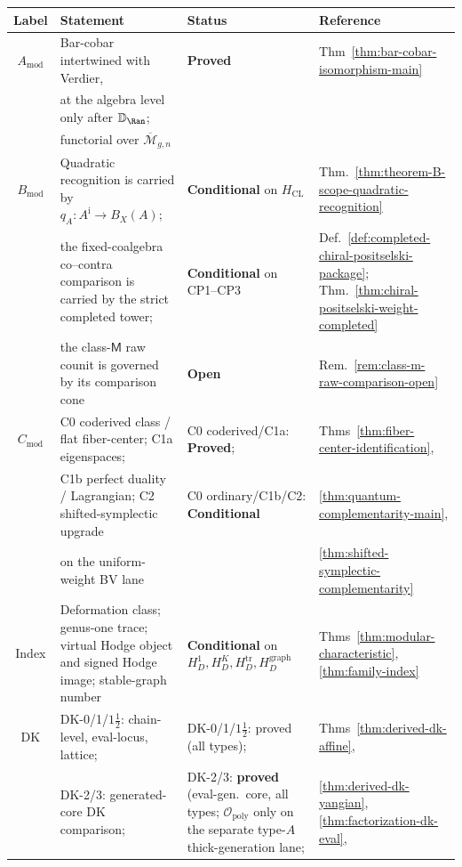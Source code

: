 \begin{center}
\renewcommand{\arraystretch}{1.3}
\begin{tabular}{@{}cp{4.4cm}p{3.8cm}p{4.6cm}@{}}
\toprule
\textbf{Label} & \textbf{Statement} & \textbf{Status} & \textbf{Reference} \\
\midrule
$A_{\mathrm{mod}}$ & Bar-cobar intertwined with Verdier, & \textbf{Proved} & Thm~\ref{thm:bar-cobar-isomorphism-main} \\
 & at the algebra level only after $\mathbb{D}_{\Ran}$; & & \\
 & functorial over $\overline{\mathcal{M}}_{g,n}$ & & \\[2pt]
$B_{\mathrm{mod}}$ & Quadratic recognition is carried by
$q_A\colon A^{\mathrm i}\to B_X(A)$; & \textbf{Conditional} on
$H_{\mathrm{CL}}$ & Thm.~\ref{thm:theorem-B-scope-quadratic-recognition} \\
 & the fixed-coalgebra co--contra comparison is carried by the
strict completed tower; & \textbf{Conditional} on CP1--CP3 &
Def.~\ref{def:completed-chiral-positselski-package};
Thm.~\ref{thm:chiral-positselski-weight-completed} \\
 & the class-$\mathsf M$ raw counit is governed by its comparison
cone & \textbf{Open} &
Rem.~\ref{rem:class-m-raw-comparison-open} \\[2pt]
$C_{\mathrm{mod}}$ & C0 coderived class / flat fiber-center; C1a eigenspaces; & C0 coderived/C1a: \textbf{Proved}; & Thms~\ref{thm:fiber-center-identification}, \\
 & C1b perfect duality / Lagrangian; C2 shifted-symplectic upgrade & C0 ordinary/C1b/C2: \textbf{Conditional} & \ref{thm:quantum-complementarity-main}, \\
 & on the uniform-weight BV lane & & \ref{thm:shifted-symplectic-complementarity} \\[2pt]
Index & Deformation class; genus-one trace; virtual Hodge object and
signed Hodge image; stable-graph number & \textbf{Conditional} on
$H_D^1,H_D^K,H_D^{\mathrm{tr}},H_D^{\mathrm{graph}}$ &
Thms~\ref{thm:modular-characteristic},
\ref{thm:family-index} \\[2pt]
DK & DK-0/1/$1\frac{1}{2}$: chain-level, eval-locus, lattice; & DK-0/1/$1\frac{1}{2}$: proved (all types); & Thms~\ref{thm:derived-dk-affine}, \\
 & DK-2/3: generated-core DK comparison; & DK-2/3: \textbf{proved} (eval-gen.\ core, all types; $\mathcal{O}_{\mathrm{poly}}$ only on the separate type-$A$ thick-generation lane; & \ref{thm:derived-dk-yangian}, \ref{thm:factorization-dk-eval}, \\

\end{tabular}
\end{center}
